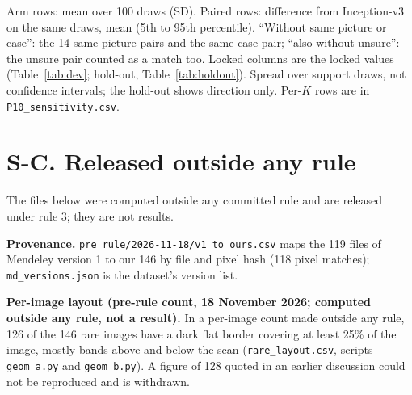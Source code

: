 \begin{table}[!htbp]
\caption{Post hoc (P10; rule committed 18 Nov 2026, computed 21 Nov 2026). Five-way macro recall, mean over $K=1$--8 (prototype classifier, locked episodes), locked and recomputed without the marked matches: in development, without each query that shares a mark with a support of its episode; on the hold-out, without each hold-out image marked against any development image. Beside the locked numbers, never replacing them.}
\label{tab:p10}
\centering\footnotesize
\setlength{\tabcolsep}{4pt}
\resizebox{\textwidth}{!}{}
\par\smallskip
\parbox{0.9\textwidth}{\footnotesize Arm rows: mean over 100 draws (SD). Paired rows: difference from Inception-v3 on the same draws, mean (5th to 95th percentile). ``Without same picture or case'': the 14 same-picture pairs and the same-case pair; ``also without unsure'': the unsure pair counted as a match too. Locked columns are the locked values (Table~\ref{tab:dev}; hold-out, Table~\ref{tab:holdout}). Spread over support draws, not confidence intervals; the hold-out shows direction only. Per-$K$ rows are in \texttt{P10\_sensitivity.csv}.}
\end{table}

\section*{S-C. Released outside any rule}
The files below were computed outside any committed rule and are released under rule 3; they are not results.

\textbf{Provenance.} \texttt{pre\_rule/2026-11-18/v1\_to\_ours.csv} maps the 119 files of Mendeley version 1 to our 146 by file and pixel hash (118 pixel matches); \texttt{md\_versions.json} is the dataset's version list.

\textbf{Per-image layout (pre-rule count, 18 November 2026; computed outside any rule, not a result).} In a per-image count made outside any rule, 126 of the 146 rare images have a dark flat border covering at least 25\% of the image, mostly bands above and below the scan (\texttt{rare\_layout.csv}, scripts \texttt{geom\_a.py} and \texttt{geom\_b.py}). A figure of 128 quoted in an earlier discussion could not be reproduced and is withdrawn.

